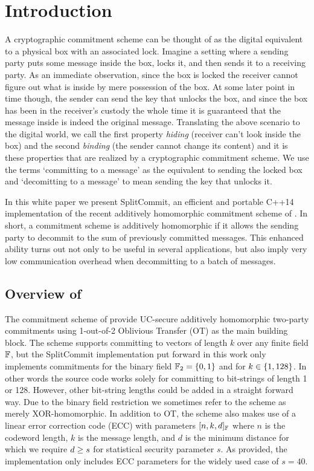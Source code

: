 
\section{Introduction}

A cryptographic commitment scheme can be thought of as the digital equivalent to a  physical box with an associated lock. Imagine a setting where a sending party puts some message inside the box, locks it, and then sends it to a receiving party. As an immediate observation, since the box is locked the receiver cannot figure out what is inside by mere possession of the box. At some later point in time though, the sender can send the key that unlocks the box, and since the box has been in the receiver's custody the whole time it is guaranteed that the message inside is indeed the original message. Translating the above scenario to the digital world, we call the first property \textit{hiding} (receiver can't look inside the box) and the second \textit{binding} (the sender cannot change its content) and it is these properties that are realized by a cryptographic commitment scheme. We use the terms `committing to a message' as the equivalent to sending the locked box and `decomitting to a message' to mean sending the key that unlocks it.

In this white paper we present SplitCommit, an efficient and portable C++14 implementation of the recent additively homomorphic commitment scheme of \cite{DBLP:conf/tcc/FrederiksenJNT16}. In short, a commitment scheme is additively homomorphic if it allows the sending party to decommit to the sum of previously committed messages. This enhanced ability turns out not only to be useful in several applications, but also imply very low communication overhead when decommitting to a batch of messages.

\subsection{Overview of \cite{DBLP:conf/tcc/FrederiksenJNT16}}
The commitment scheme of \cite{DBLP:conf/tcc/FrederiksenJNT16} provide UC-secure additively homomorphic two-party commitments using 1-out-of-2 Oblivious Transfer (OT) as the main building block. The scheme supports committing to vectors of length $k$ over any finite field $\mathbb{F}$, but the SplitCommit implementation put forward in this work only implements commitments for the binary field $\mathbb{F}_2 = \left\{ 0,1 \right\}$ and for $k \in \left\{ 1,128 \right\}$. In other words the source code works solely for committing to bit-strings of length 1 or 128. However, other bit-string lengths could be added in a straight forward way. Due to the binary field restriction we sometimes refer to the scheme as merely XOR-homomorphic. In addition to OT, the scheme also makes use of a linear error correction code (ECC) with parameters $[n,k,d]_{\mathbb{F}}$ where $n$ is the codeword length, $k$ is the message length, and $d$ is the minimum distance for which we require $d \geq s$ for statistical security parameter $s$. As provided, the implementation only includes ECC parameters for the widely used case of $s=40$. 

